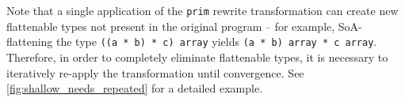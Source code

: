 Note that a single application of the \texttt{prim} rewrite transformation can
create new flattenable types not present in the original program -- for example,
SoA-flattening the type \texttt{((a * b) * c) array} yields \texttt{(a * b)
array * c array}. Therefore, in order to completely eliminate flattenable types,
it is necessary to iteratively re-apply the transformation until convergence.
See \cref{fig:shallow_needs_repeated} for a detailed example.






